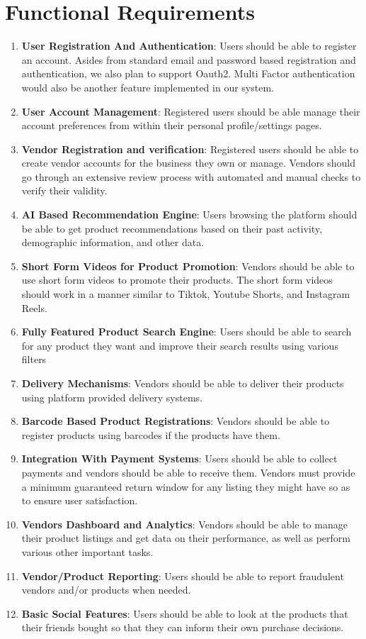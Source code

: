 \documentclass[12pt]{report}
\begin{document}
\section{Functional Requirements}

\begin{enumerate}
	\item \textbf{User Registration And Authentication}: Users should be able to register an account.
	      Asides from standard email and password based registration and authentication, we
	      also plan to support Oauth2. Multi Factor authentication would also be another feature
	      implemented in our system.
	\item \textbf{User Account Management}: Registered users should be able manage their account
	      preferences from within their personal profile/settings pages.
	\item \textbf{Vendor Registration and verification}: Registered users should be able to create
	      vendor accounts for the business they own or manage. Vendors should go through an
	      extensive review process with automated and manual checks to verify their validity.
	\item \textbf{AI Based Recommendation Engine}: Users browsing the platform should be able to
	      get product recommendations based on their past activity, demographic information,
	      and other data.
	\item \textbf{Short Form Videos for Product Promotion}: Vendors should be able to use short
	      form videos to promote their products. The short form videos should work in a
	      manner similar to Tiktok, Youtube Shorts, and Instagram Reels.
	\item \textbf{Fully Featured Product Search Engine}: Users should be able to search for any
	      product they want and improve their search results using various filters
	\item \textbf{Delivery Mechanisms}: Vendors should be able to deliver their products using
	      platform provided delivery systems.
	\item \textbf{Barcode Based Product Registrations}: Vendors should be able to register products
	      using barcodes if the products have them.
	\item \textbf{Integration With Payment Systems}: Users should be able to collect payments and
	      vendors should be able to receive them. Vendors must provide a minimum guaranteed
	      return window for any listing they might have so as to ensure user satisfaction.
	\item \textbf{Vendors Dashboard and Analytics}: Vendors should be able to manage their product
	      listings and get data on their performance, as well as perform various other important
	      tasks.
	\item \textbf{Vendor/Product Reporting}: Users should be able to report fraudulent vendors and/or products
	      when needed.
	\item \textbf{Basic Social Features}: Users should be able to look at the products that their friends
	      bought so that they can inform their own purchase decisions.
\end{enumerate}
\end{document}
